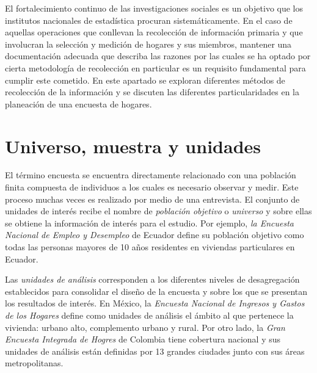 \documentclass[12pt,spanish,]{book}
\begin{document}
El fortalecimiento continuo de las investigaciones sociales es un objetivo que los institutos nacionales de estadística procuran sistemáticamente. En el caso de aquellas operaciones que conllevan la recolección de información primaria y que involucran la selección y medición de hogares y sus miembros, mantener una documentación adecuada que describa las razones por las cuales se ha optado por cierta metodología de recolección en particular es un requisito fundamental para cumplir este cometido. En este apartado se exploran diferentes métodos de recolección de la información y se discuten las diferentes particularidades en la planeación de una encuesta de hogares.

\hypertarget{universo-muestra-y-unidades}{%
\section{Universo, muestra y unidades}\label{universo-muestra-y-unidades}}

El término encuesta se encuentra directamente relacionado con una población finita compuesta de individuos a los cuales es necesario observar y medir. Este proceso muchas veces es realizado por medio de una entrevista. El conjunto de unidades de interés recibe el nombre de \emph{población objetivo} o \emph{universo} y sobre ellas se obtiene la información de interés para el estudio. Por ejemplo, \emph{la Encuesta Nacional de Empleo y Desempleo} de Ecuador define su población objetivo como todas las personas mayores de 10 años residentes en viviendas particulares en Ecuador.

Las \emph{unidades de análisis} corresponden a los diferentes niveles de desagregación establecidos para consolidar el diseño de la encuesta y sobre los que se presentan los resultados de interés. En México, la \emph{Encuesta Nacional de Ingresos y Gastos de los Hogares} define como unidades de análisis el ámbito al que pertenece la vivienda: urbano alto, complemento urbano y rural. Por otro lado, la \emph{Gran Encuesta Integrada de Hogres} de Colombia tiene cobertura nacional y sus unidades de análisis están definidas por 13 grandes ciudades junto con sus áreas metropolitanas.
\end{document}
